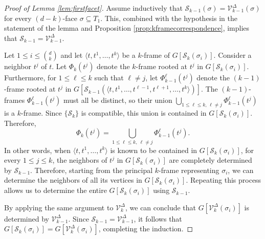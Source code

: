 \documentclass[11pt,twoside]{article}
\theoremstyle{definition}
\newcommand{\cS}{\mathcal{S}}
\newcommand{\cV}{\mathcal{V}}
\begin{document}
\begin{proof}[Proof of Lemma \ref{lem:firstfacet}]
    Assume inductively that $\cS_{k-1}(\sigma) = \cV^\Delta_{k-1}(\sigma)$ for every $(d-k)$-face $\sigma \subseteq T_1$. This, combined with the hypothesis in the statement of the lemma and Proposition \ref{prop:kframecorrespondence}, implies that $\cS_{k-1} = \cV^\Delta_{k-1}$. 

    Let $1 \le i \le {d \choose k}$ and let $\langle t, t^1, \dots, t^k \rangle$ be a $k$-frame of $G[\cS_k(\sigma_i)]$. Consider a neighbor $t^j$ of $t$. Let $\Phi_k(t^j)$ denote the $k$-frame rooted at $t^j$ in $G[\cS_k(\sigma_i)]$. Furthermore, for $1 \le \ell \le k$ such that $\ell \ne j$, let $\Phi^\ell_{k-1}(t^j)$ denote the $(k-1)$-frame rooted at $t^j$ in $G[\cS_{k-1}(\langle t, t^1, \dots, t^{\ell-1}, t^{\ell+1}, \dots, t^k \rangle)]$. The $(k-1)$-frames $\Phi^\ell_{k-1}(t^j)$ must all be distinct, so their union $\bigcup_{1 \le \ell \le k, \, \ell \ne j} \Phi^\ell_{k-1}(t^j)$ is a $k$-frame. Since $\{\cS_k\}$ is compatible, this union is contained in $G[\cS_k(\sigma_i)]$. Therefore,
    \[
    \Phi_k(t^j) = \bigcup_{1 \le \ell \le k,\ \ell \ne j} \Phi^\ell_{k-1}(t^j). 
    \]
    In other words, when $\langle t, t^1, \dots, t^k \rangle$ is known to be contained in $G[\cS_k(\sigma_i)]$, for every $1 \le j \le k$, the neighbors of $t^j$ in $G[\cS_k(\sigma_i)]$ are completely determined by $\cS_{k-1}$. Therefore, starting from the principal $k$-frame representing $\sigma_i$, we can determine the neighbors of all its vertices in $G[\cS_k(\sigma_i)]$. Repeating this process allows us to determine the entire $G[\cS_k(\sigma_i)]$ using $\cS_{k-1}$. 

    By applying the same argument to $\cV^\Delta_k$, we can conclude that $G[\cV^\Delta_k(\sigma_i)]$ is determined by $\cV^\Delta_{k-1}$. Since $\cS_{k-1} = \cV^\Delta_{k-1}$, it follows that $G[\cS_k(\sigma_i)] = G[\cV^\Delta_k(\sigma_i)]$, completing the induction. 
    \end{proof}
\end{document}
